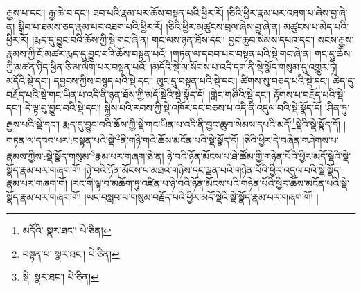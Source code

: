 རྒྱས་པ་དང་། རྒྱ་ཆེ་བ་དང་། ཟབ་པའི་རྣམ་པར་ཆོས་བསྟན་པའི་ཕྱིར་རོ། །ཅིའི་ཕྱིར་རྣམ་པར་འཐག་པ་ཞེས་བྱ་ཞེ་ན། སྒྲིབ་པ་ཐམས་ཅད་རྣམ་པར་འཐག་པའི་ཕྱིར་རོ། །ཅིའི་ཕྱིར་མཚུངས་བྲལ་ཞེས་བྱ་ཞེ་ན། མཚུངས་པ་མེད་པའི་ཕྱིར་རོ། །རྨད་དུ་བྱུང་བའི་ཆོས་ཀྱི་སྡེ་གང་ཞེ་ན། གང་ལས་ཉན་ཐོས་དང་། བྱང་ཆུབ་སེམས་དཔའ་དང་། སངས་རྒྱས་རྣམས་ཀྱི་ངོ་མཚར་རྨད་དུ་བྱུང་བའི་ཆོས་བསྟན་པའོ། །གཏན་ལ་དབབ་པར་བསྟན་པའི་སྡེ་གང་ཞེ་ན། གང་དུ་ཆོས་ཀྱི་མཚན་ཉིད་ཕྱིན་ཅི་མ་ལོག་པར་བསྟན་པའོ། །མདོའི་སྡེ་ལ་སོགས་པ་འདི་དག་ནི་སྡེ་སྣོད་གསུམ་དུ་འགྱུར་ཏེ། མདོའི་སྡེ་དང་། དབྱངས་ཀྱིས་བསྙད་པའི་སྡེ་དང་། ལུང་དུ་བསྟན་པའི་སྡེ་དང་། ཚིགས་སུ་བཅད་པའི་སྡེ་དང་། ཆེད་དུ་བརྗོད་པའི་སྡེ་གང་ཡིན་པ་འདི་ནི་ཉན་ཐོས་ཀྱི་མདོ་སྡེའི་སྡེ་སྣོད་དོ། །གླེང་གཞིའི་སྡེ་དང་། རྟོགས་པ་བརྗོད་པའི་སྡེ་དང་། དེ་ལྟ་བུ་བྱུང་བའི་སྡེ་དང་། སྐྱེས་པའི་རབས་ཀྱི་སྡེ་འཁོར་དང་བཅས་པ་འདི་ནི་འདུལ་བའི་སྡེ་སྣོད་དོ། །ཤིན་ཏུ་རྒྱས་པའི་སྡེ་དང་། རྨད་དུ་བྱུང་བའི་ཆོས་ཀྱི་སྡེ་གང་ཡིན་པ་འདི་ནི་བྱང་ཆུབ་སེམས་དཔའི་མདོ་\footnote{མདོའི་  སྣར་ཐང་།  པེ་ཅིན། }སྡེའི་སྡེ་སྣོད་དོ། །གཏན་ལ་དབབ་པར་:བསྟན་པའི་སྡེ་\footnote{བསྟན་པ་  སྣར་ཐང་།  པེ་ཅིན། }ནི་གཉི་གའི་ཆོས་མངོན་པའི་སྡེ་སྣོད་དོ། །ཅིའི་ཕྱིར་དེ་བཞིན་གཤེགས་པ་རྣམས་ཀྱིས་:སྡེ་སྣོད་གསུམ་\footnote{སྡེ་  སྣར་ཐང་།  པེ་ཅིན། }རྣམ་པར་གཞག་ཅེ་ན། ཉེ་བའི་ཉོན་མོངས་པ་ཐེ་ཚོམ་གྱི་གཉེན་པོའི་ཕྱིར་མདོ་སྡེའི་སྡེ་སྣོད་རྣམ་པར་གཞག་གོ། །ཉེ་བའི་ཉོན་མོངས་པ་མཐའ་གཉིས་དང་ལྡན་པའི་གཉེན་པོའི་ཕྱིར་འདུལ་བའི་སྡེ་སྣོད་རྣམ་པར་གཞག་གོ། །རང་གི་ལྟ་བ་མཆོག་ཏུ་འཛིན་པ་ཉེ་བའི་ཉོན་མོངས་པའི་གཉེན་པོའི་ཕྱིར་ཆོས་མངོན་པའི་སྡེ་སྣོད་རྣམ་པར་གཞག་གོ། །ཡང་བསླབ་པ་གསུམ་བརྗོད་པའི་ཕྱིར་མདོ་སྡེའི་སྡེ་སྣོད་རྣམ་པར་གཞག་གོ། །
